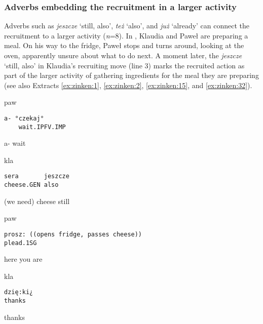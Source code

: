 \documentclass[output=paper]{langsci/langscibook}
\begin{document}
\subsubsection{Adverbs embedding the recruitment in a larger activity}

Adverbs such as \textit{jeszcze} `still, also', \textit{też} `also', and \textit{już} `already' can connect the recruitment to a larger activity (\textit{n}=8).  In , Klaudia and Paweł are preparing a meal.  On his way to the fridge, Paweł stops and turns around, looking at the oven, apparently unsure about what to do next.  A moment later, the \textit{jeszcze} `still, also' in Klaudia’s recruiting move (line 3) marks the recruited action as part of the larger activity of gathering ingredients for the meal they are preparing (see also Extracts \ref{ex:zinken:1}, \ref{ex:zinken:2}, \ref{ex:zinken:15}, and \ref{ex:zinken:32}).

\vspace{2mm}
%
\begin{transbox}{1}{paw}
\begin{verbatim}
a- °czekaj°
    wait.IPFV.IMP
\end{verbatim}
a- wait
\end{transbox}
%
%
\begin{mdframednoverticalspace}[style=firstfoc]
\begin{transbox}{3}{kla}
\begin{verbatim}
sera       jeszcze
cheese.GEN also
\end{verbatim}
(we need) cheese still
\end{transbox}
\end{mdframednoverticalspace}
%
\begin{mdframednoverticalspace}[style=secondfoc]
\begin{transbox}{4}{paw}
\begin{verbatim}
prosz: ((opens fridge, passes cheese))
plead.1SG
\end{verbatim}
here you are
\end{transbox}
\end{mdframednoverticalspace}
%
\begin{transbox}{5}{kla}
\begin{verbatim}
dzię:ki¿
thanks
\end{verbatim}
thanks
\end{transbox}\bigskip
\end{document}
